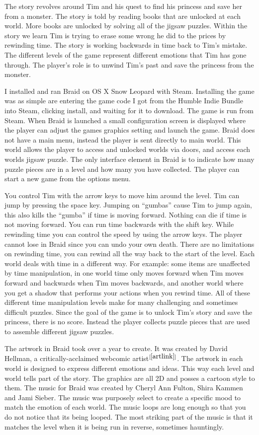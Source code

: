 \documentclass[a4paper,12pt]{report}
\begin{document}
The story revolves around Tim and his quest to find his princess and save her
from a monster.  The story is told by reading books that are unlocked at each
world.  More books are unlocked by solving all of the jigsaw puzzles.  Within
the story we learn Tim is trying to erase some wrong he did to the prices by
rewinding time.  The story is working backwards in time back to Tim's mistake.
The different levels of the game represent different emotions that Tim has gone
through.  The player's role is to unwind Tim's past and save the princess from
the monster.

I installed and ran Braid on OS X Snow Leopard with Steam.  Installing the game
was as simple are entering the game code I got from the Humble Indie Bundle into
Steam, clicking install, and waiting for it to download.  The game is run from
Steam.  When Braid is launched a small configuration screen is displayed where
the player can adjust the games graphics setting and launch the game.  Braid
does not have a main menu, instead the player is sent directly to main world.
This world allows the player to access and unlocked worlds via doors, and access
each worlds jigsaw puzzle.  The only interface element in Braid is to indicate
how many puzzle pieces are in a level and how many you have collected.  The
player can start a new game from the options menu.

You control Tim with the arrow keys to move him around the level.  Tim can jump
by pressing the space key.  Jumping on ``gumbas'' cause Tim to jump again, this
also kills the ``gumba'' if time is moving forward.  Nothing can die if time is
not moving forward.  You can run time backwards with the shift key.  While
rewinding time you can control the speed by using the arrow keys.  The player
cannot lose in Braid since you can undo your own death.  There are no
limitations on rewinding time, you can rewind all the way back to the start of
the level.  Each world deals with time in a different way.  For example: some
items are unaffected by time manipulation, in one world time only moves forward
when Tim moves forward and backwards when Tim moves backwards, and another world
where you get a shadow that performs your actions when you rewind time.  All of
these different time manipulation levels make for many challenging and sometimes
difficult puzzles.  Since the goal of the game is to unlock Tim's story and save
the princess, there is no score.  Instead the player collects puzzle pieces that
are used to assemble different jigsaw puzzles.

The artwork in Braid took over a year to create.  It was created by David
Hellman, a critically-acclaimed webcomic artist$^{[\ref{artlink}]}$.  The
artwork in each world is designed to express different emotions and ideas.  This
way each level and world tells part of the story.  The graphics are
all 2D and posses a cartoon style to them.  The music for Braid was created by
Cheryl Ann Fulton, Shira Kammen and Jami Sieber.  The music was purposely select
to create a specific mood to match the emotion of each world.  The music loops
are long enough so that you do not notice that its being looped.  The most
striking part of the music is that it matches the level when it is being run in
reverse, sometimes hauntingly. 
\end{document}
